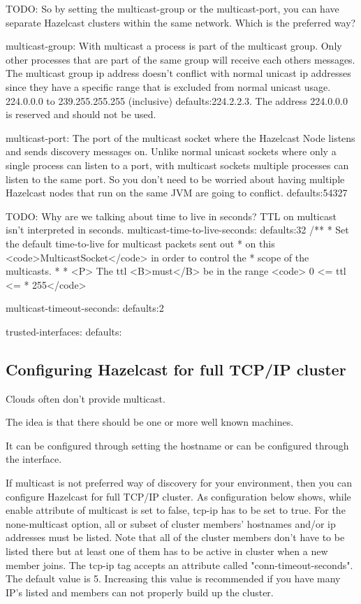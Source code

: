 TODO: So by setting the multicast-group or the multicast-port, you can have separate Hazelcast clusters within the same network. Which is the preferred way?

multicast-group:
With multicast a process is part of the multicast group. Only other processes that are part of the same group will receive each others messages. The multicast group ip address doesn't conflict with normal unicast ip addresses since they have a specific range that is excluded from normal unicast usage. 224.0.0.0 to 239.255.255.255 (inclusive)
defaults:224.2.2.3. The address 224.0.0.0 is reserved and should not be used.

multicast-port: The port of the multicast socket where the Hazelcast Node listens and sends discovery messages on. Unlike normal unicast sockets where only a single process can listen to a port, with multicast sockets multiple processes can listen to the same port. So you don't need to be worried about having multiple Hazelcast nodes that run on the same JVM are going to conflict.
defaults:54327

TODO: Why are we talking about time to live in seconds? TTL on multicast isn't interpreted in seconds.
multicast-time-to-live-seconds:
defaults:32
/**
   * Set the default time-to-live for multicast packets sent out
   * on this <code>MulticastSocket</code> in order to control the 
   * scope of the multicasts.
   *
   * <P> The ttl <B>must</B> be in the range <code> 0 <= ttl <=
   * 255</code>


multicast-timeout-seconds:
defaults:2

trusted-interfaces:
defaults:


\subsection{Configuring Hazelcast for full TCP/IP cluster}

Clouds often don't provide multicast.

The idea is that there should be one or more well known machines.

It can be configured through setting the hostname or can be configured through the interface. 

If multicast is not preferred way of discovery for your environment, then you can configure Hazelcast for full TCP/IP cluster. As configuration below shows, while enable attribute of multicast is set to false, tcp-ip has to be set to true. For the none-multicast option, all or subset of cluster members' hostnames and/or ip addresses must be listed. Note that all of the cluster members don't have to be listed there but at least one of them has to be active in cluster when a new member joins. The tcp-ip tag accepts an attribute called "conn-timeout-seconds". The default value is 5. Increasing this value is recommended if you have many IP's listed and members can not properly build up the cluster.

